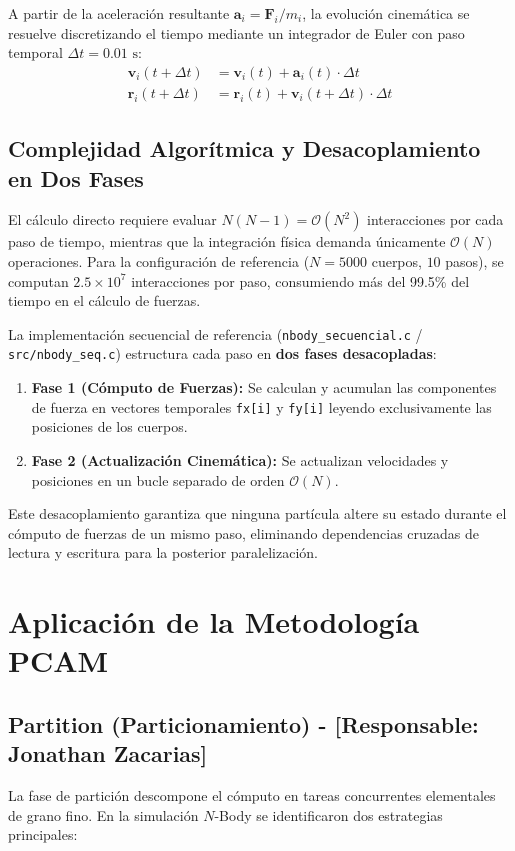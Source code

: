 \documentclass[11pt,a4paper]{article}
\begin{document}
A partir de la aceleración resultante $\mathbf{a}_i = \mathbf{F}_i / m_i$, la evolución cinemática se resuelve discretizando el tiempo mediante un integrador de Euler con paso temporal $\Delta t = 0.01\text{ s}$:
\begin{align}
    \mathbf{v}_i(t + \Delta t) &= \mathbf{v}_i(t) + \mathbf{a}_i(t) \cdot \Delta t \\
    \mathbf{r}_i(t + \Delta t) &= \mathbf{r}_i(t) + \mathbf{v}_i(t + \Delta t) \cdot \Delta t
\end{align}

\subsection{Complejidad Algorítmica y Desacoplamiento en Dos Fases}
El cálculo directo requiere evaluar $N(N - 1) = \mathcal{O}(N^2)$ interacciones por cada paso de tiempo, mientras que la integración física demanda únicamente $\mathcal{O}(N)$ operaciones. Para la configuración de referencia ($N = 5000$ cuerpos, $10$ pasos), se computan $2.5 \times 10^7$ interacciones por paso, consumiendo más del 99.5\% del tiempo en el cálculo de fuerzas.

La implementación secuencial de referencia (\texttt{nbody\_secuencial.c} / \texttt{src/nbody\_seq.c}) estructura cada paso en \textbf{dos fases desacopladas}:
\begin{enumerate}
    \item \textbf{Fase 1 (Cómputo de Fuerzas):} Se calculan y acumulan las componentes de fuerza en vectores temporales \texttt{fx[i]} y \texttt{fy[i]} leyendo exclusivamente las posiciones de los cuerpos.
    \item \textbf{Fase 2 (Actualización Cinemática):} Se actualizan velocidades y posiciones en un bucle separado de orden $\mathcal{O}(N)$.
\end{enumerate}
Este desacoplamiento garantiza que ninguna partícula altere su estado durante el cómputo de fuerzas de un mismo paso, eliminando dependencias cruzadas de lectura y escritura para la posterior paralelización.

\section{Aplicación de la Metodología PCAM}

\subsection{Partition (Particionamiento) - [Responsable: Jonathan Zacarias]}
La fase de partición descompone el cómputo en tareas concurrentes elementales de grano fino. En la simulación $N$-Body se identificaron dos estrategias principales:
\end{document}
